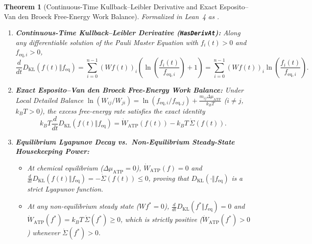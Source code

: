 \documentclass[11pt,a4paper]{article}
\newtheorem{theorem}{Theorem}[section]
\theoremstyle{definition}
\begin{document}
\begin{theorem}[Continuous-Time Kullback--Leibler Derivative and Exact Esposito--Van den Broeck Free-Energy Work Balance]
\label{thm:esposito_free_energy}
Formalized in Lean~4 as \texttt{}.
\begin{enumerate}
  \item \textbf{Continuous-Time Kullback--Leibler Derivative (\texttt{HasDerivAt}):} Along any differentiable solution of the Pauli Master Equation with $f_i(t) > 0$ and $f_{\mathrm{eq},i} > 0$,
  \begin{equation}
    \frac{d}{dt}D_{\mathrm{KL}}(f(t)\Vert f_{\mathrm{eq}}) = \sum_{i=0}^{n-1} (Wf(t))_i \left(\ln\!\left(\frac{f_i(t)}{f_{\mathrm{eq},i}}\right) + 1\right) = \sum_{i=0}^{n-1} (Wf(t))_i \ln\!\left(\frac{f_i(t)}{f_{\mathrm{eq},i}}\right).
  \end{equation}
  \item \textbf{Exact Esposito--Van den Broeck Free-Energy Work Balance:} Under Local Detailed Balance $\ln(W_{ij}/W_{ji}) = \ln(f_{\mathrm{eq},i}/f_{\mathrm{eq},j}) + \frac{m_{ij}\Delta\mu_{\mathrm{ATP}}}{k_B T}$ ($i \ne j$, $k_B T > 0$), the excess free-energy rate satisfies the exact identity
  \begin{equation}
    k_B T \frac{d}{dt}D_{\mathrm{KL}}(f(t)\Vert f_{\mathrm{eq}}) = \dot{W}_{\mathrm{ATP}}(f(t)) - k_B T\,\dot{\Sigma}(f(t)).
  \end{equation}
  \item \textbf{Equilibrium Lyapunov Decay vs.\ Non-Equilibrium Steady-State Housekeeping Power:}
  \begin{itemize}
    \item At chemical equilibrium ($\Delta\mu_{\mathrm{ATP}} = 0$), $\dot{W}_{\mathrm{ATP}}(f) = 0$ and $\frac{d}{dt}D_{\mathrm{KL}}(f(t)\Vert f_{\mathrm{eq}}) = -\dot{\Sigma}(f(t)) \le 0$, proving that $D_{\mathrm{KL}}(\cdot\Vert f_{\mathrm{eq}})$ is a strict Lyapunov function.
    \item At any non-equilibrium steady state ($Wf^* = 0$), $\frac{d}{dt}D_{\mathrm{KL}}(f^*\Vert f_{\mathrm{eq}}) = 0$ and $\dot{W}_{\mathrm{ATP}}(f^*) = k_B T\,\dot{\Sigma}(f^*) \ge 0$, which is strictly positive ($\dot{W}_{\mathrm{ATP}}(f^*) > 0$) whenever $\dot{\Sigma}(f^*) > 0$.
  \end{itemize}
\end{enumerate}
\end{theorem}
\end{document}

